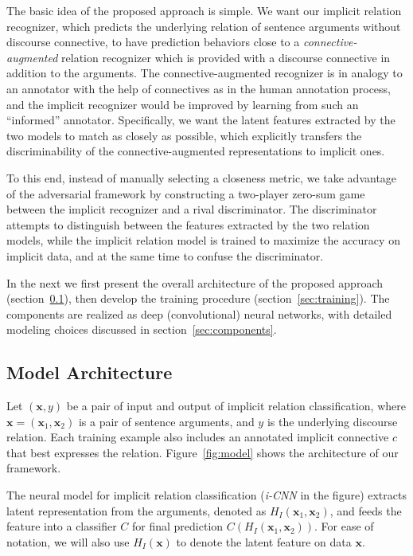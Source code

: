 \documentclass[11pt,a4paper]{article}
\begin{document}
The basic idea of the proposed approach is simple. We want our implicit relation recognizer, which predicts the underlying relation of sentence arguments without discourse connective, to have prediction behaviors close to a {\it connective-augmented} relation recognizer which is provided with a discourse connective in addition to the arguments. The connective-augmented recognizer is in analogy to an annotator with the help of connectives as in the human annotation process, and the implicit recognizer would be improved by learning from such an ``informed'' annotator. 
Specifically, we want the latent features extracted by the two models to match as closely as possible, which explicitly transfers the discriminability of the connective-augmented representations to implicit ones. 

To this end, instead of manually selecting a closeness metric, we take advantage of the adversarial framework by constructing a two-player zero-sum game between the implicit recognizer and a rival discriminator. The discriminator attempts to distinguish between the features extracted by the two relation models, while the implicit relation model is trained to maximize the accuracy on implicit data, and at the same time to confuse the discriminator. 

In the next we first present the overall architecture of the proposed approach (section~\ref{sec:arch}), then develop the training procedure (section~\ref{sec:training}). The components are realized as deep (convolutional) neural networks, with detailed modeling choices discussed in section~\ref{sec:components}.

\subsection{Model Architecture} \label{sec:arch}
%
Let $(\bm{x}, y)$ be a pair of input and output of implicit relation classification, where $\bm{x}=(\bm{x}_1, \bm{x}_2)$ is a pair of sentence arguments, and $y$ is the underlying discourse relation. Each training example also includes an annotated implicit connective $c$ that best expresses the relation. Figure~\ref{fig:model} shows the architecture of our framework.

The neural model for implicit relation classification ({\it i-CNN} in the figure) extracts latent representation from the arguments, denoted as $H_{I}(\bm{x}_1, \bm{x}_2)$, and feeds the feature into a classifier $C$ for final prediction $C(H_{I}(\bm{x}_1, \bm{x}_2))$. For ease of notation, we will also use $H_{I}(\bm{x})$ to denote the latent feature on data $\bm{x}$. 
 
\end{document}
